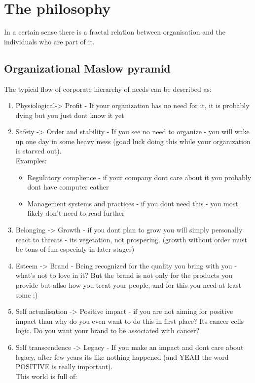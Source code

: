 
\section{The philosophy}
In a certain sense there is a fractal relation between organisation and the individuals who are part of it.

\subsection{Organizational Maslow pyramid}
The typical flow of corporate hierarchy of needs can be described as:
\begin{enumerate}
  \item Physiological-> Profit - If your organization has no need for it, it is probably dying but you just dont know it yet
  \item Safety -> Order and stability - If you see no need to organize - you will wake up one day in some heavy mess (good luck doing this while your organization is starved out). \\Examples:
  \begin{itemize}
    \item Regulatory complience - if your company dont care about it you probably dont have computer eather
    \item Management systems and practices - if you dont need this - you most likely don't need to read further
  \end{itemize} 
  \item Belonging -> Growth - if you dont plan to grow you will simply personally react to threats - its vegetation, not prospering. (growth  without order must be tons of fun especialy in later stages)
  \item Esteem -> Brand - Being recognized for the quality you bring with you - what's not to love in it? But the brand is not only for the products you provide but allso how you treat your people, and for this you need at least some ;)
  \item Self actualisation -> Positive impact - if you are not aiming for positive impact than why do you even want to do this in first place? Its cancer cells logic. Do you want your brand to be associated with cancer?
  \item Self transcendence -> Legacy - If you make an impact and dont care about legacy, after few years its like nothing happened (and YEAH the word POSITIVE is really important). \\This world is full of:
  \begin{itemize}

\end{itemize}
\end{enumerate}
